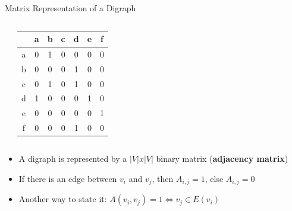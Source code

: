 \begin{frame}{Matrix Representation of a Digraph}

  \begin{columns}
    \begin{center}
  \end{center}


    {\larger
      \begin{tabular}{c|cccccc}
        & a & b & c & d & e & f \\
        \hline
        a &0&1&0&0&0&0\\
        b &0&0&0&1&0&0\\
        c &0&1&0&1&0&0\\
        d &1&0&0&0&1&0\\
        e &0&0&0&0&0&1\\
        f &0&0&0&1&0&0\\
      \end{tabular}
    }
  \end{columns}\bigskip

  \begin{itemize}
    \item A digraph is represented by a $|V|x|V|$ binary matrix ({\bf adjacency matrix})
    \item If there is an edge between $v_i$ and $v_j$, then $A_{i,j} = 1$, else $A_{i,j} = 0$ 
    \item Another way to state it:    $A(v_i,v_j) = 1 \iff v_j \in E(v_i)$
  \end{itemize}
\end{frame}
